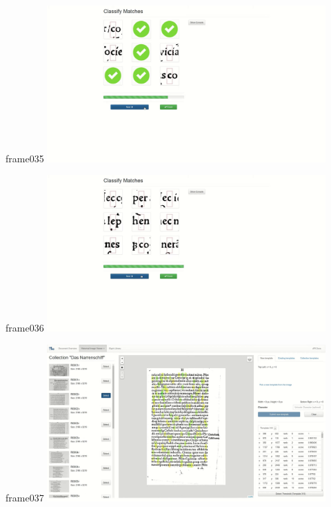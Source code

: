 \documentclass{beamer}
\begin{document}
\begin{frame}{frame035}
\includegraphics[width=0.8\textwidth]{output/exported-frames/frame035.png}
\note{}
\end{frame}

\begin{frame}{frame036}
\includegraphics[width=0.8\textwidth]{output/exported-frames/frame036.png}
\note{}
\end{frame}

\begin{frame}{frame037}
\includegraphics[width=0.8\textwidth]{output/exported-frames/frame037.png}
\note{}
\end{frame}
\end{document}
